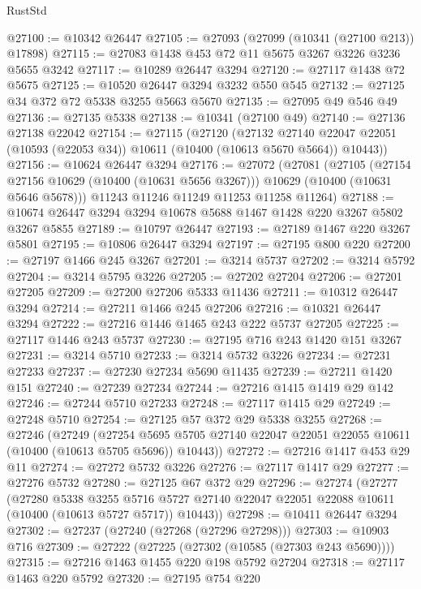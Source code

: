 \begin{lexlean}{RustStd}
\begin{coremodule}
{\begin{coremodule}
{{{{{{{{{{{{{{{{{{{{{{{{{@27100 := @10342 @26447
@27105 := @27093 (@27099 (@10341 (@27100 @213)) @17898)
@27115 := @27083 @1438 @453 @72 @11 @5675 @3267 @3226 @3236 @5655 @3242
@27117 := @10289 @26447 @3294
@27120 := @27117 @1438 @72 @5675
@27125 := @10520 @26447 @3294 @3232 @550 @545
@27132 := @27125 @34 @372 @72 @5338 @3255 @5663 @5670
@27135 := @27095 @49 @546 @49
@27136 := @27135 @5338
@27138 := @10341 (@27100 @49)
@27140 := @27136 @27138 @22042
@27154 := @27115
    (@27120
      (@27132
        @27140
        @22047
        @22051
        (@10593 (@22053 @34))
        @10611
        (@10400 (@10613 @5670 @5664))
        @10443))
@27156 := @10624 @26447 @3294
@27176 := @27072
    (@27081
      (@27105
        (@27154 @27156 @10629 (@10400 (@10631 @5656 @3267)))
        @10629
        (@10400 (@10631 @5646 @5678)))
      @11243
      @11246
      @11249
      @11253
      @11258
      @11264)
@27188 := @10674 @26447 @3294 @3294 @10678 @5688 @1467 @1428 @220 @3267 @5802 @3267 @5855
@27189 := @10797 @26447
@27193 := @27189 @1467 @220 @3267 @5801
@27195 := @10806 @26447 @3294
@27197 := @27195 @800 @220
@27200 := @27197 @1466 @245 @3267
@27201 := @3214 @5737
@27202 := @3214 @5792
@27204 := @3214 @5795 @3226
@27205 := @27202 @27204
@27206 := @27201 @27205
@27209 := @27200 @27206 @5333 @11436
@27211 := @10312 @26447 @3294
@27214 := @27211 @1466 @245 @27206
@27216 := @10321 @26447 @3294
@27222 := @27216 @1446 @1465 @243 @222 @5737 @27205
@27225 := @27117 @1446 @243 @5737
@27230 := @27195 @716 @243 @1420 @151 @3267
@27231 := @3214 @5710
@27233 := @3214 @5732 @3226
@27234 := @27231 @27233
@27237 := @27230 @27234 @5690 @11435
@27239 := @27211 @1420 @151
@27240 := @27239 @27234
@27244 := @27216 @1415 @1419 @29 @142
@27246 := @27244 @5710 @27233
@27248 := @27117 @1415 @29
@27249 := @27248 @5710
@27254 := @27125 @57 @372 @29 @5338 @3255
@27268 := @27246
    (@27249
      (@27254 @5695 @5705 @27140 @22047 @22051 @22055 @10611 (@10400 (@10613 @5705 @5696)) @10443))
@27272 := @27216 @1417 @453 @29 @11
@27274 := @27272 @5732 @3226
@27276 := @27117 @1417 @29
@27277 := @27276 @5732
@27280 := @27125 @67 @372 @29
@27296 := @27274
    (@27277
      (@27280
        @5338
        @3255
        @5716
        @5727
        @27140
        @22047
        @22051
        @22088
        @10611
        (@10400 (@10613 @5727 @5717))
        @10443))
@27298 := @10411 @26447 @3294
@27302 := @27237 (@27240 (@27268 (@27296 @27298)))
@27303 := @10903 @716
@27309 := @27222 (@27225 (@27302 (@10585 (@27303 @243 @5690))))
@27315 := @27216 @1463 @1455 @220 @198 @5792 @27204
@27318 := @27117 @1463 @220 @5792
@27320 := @27195 @754 @220
}}}}}}}}}}}}}}}}}}}}}}}}}
\end{coremodule}}
\end{coremodule}
\end{lexlean}
